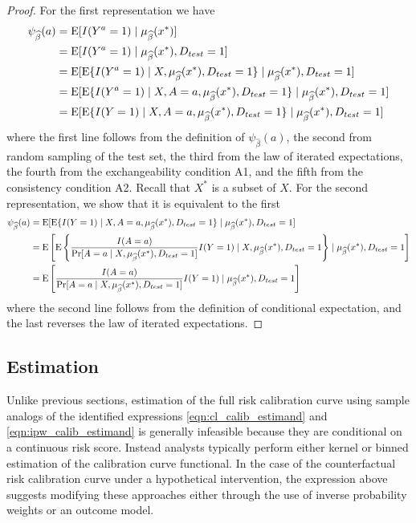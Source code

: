 \begin{proof}
    For the first representation we have 
    \begin{align*}
        \psi_{\widehat{\beta}}(a) &= \operatorname{E}[I(Y^a = 1) \mid \mu_{\widehat{\beta}}(x^*)] \\
        & = \operatorname{E}[I(Y^a = 1) \mid \mu_{\widehat{\beta}}(x^*), D_{test} = 1] \\
        & = \operatorname{E}[\operatorname{E}\{I(Y^a = 1) \mid X, \mu_{\widehat{\beta}}(x^*), D_{test} = 1\}\mid \mu_{\widehat{\beta}}(x^*), D_{test} = 1] \\
        & = \operatorname{E}[\operatorname{E}\{I(Y^a = 1) \mid X, A = a, \mu_{\widehat{\beta}}(x^*), D_{test} = 1\}\mid \mu_{\widehat{\beta}}(x^*), D_{test} = 1] \\
        & = \operatorname{E}[\operatorname{E}\{I(Y = 1) \mid X, A = a, \mu_{\widehat{\beta}}(x^*), D_{test} = 1\}\mid \mu_{\widehat{\beta}}(x^*), D_{test} = 1]
    \end{align*}
    where the first line follows from the definition of $\psi_{\widehat{\beta}}(a)$, the second from random sampling of the test set, the third from the law of iterated expectations, the fourth from the exchangeability condition A1, and the fifth from the consistency condition A2. Recall that $X^*$ is a subset of $X$. For the second representation, we show that it is equivalent to the first 
    \begin{align*}
        \psi_{\widehat{\beta}}(a) &= \operatorname{E}[\operatorname{E}\{I(Y = 1) \mid X, A = a, \mu_{\widehat{\beta}}(x^*), D_{test} = 1\}\mid \mu_{\widehat{\beta}}(x^*), D_{test} = 1] \\
        &= \operatorname{E}\left[\operatorname{E}\left\{\frac{I(A = a)}{\Pr[A = a \mid X, \mu_{\widehat{\beta}}(x^*), D_{test} = 1]} I(Y=1) \mid X, \mu_{\widehat{\beta}}(x^*), D_{test} = 1\right\}\mid \mu_{\widehat{\beta}}(x^*), D_{test} = 1\right] \\
        &= \operatorname{E}\left[\frac{I(A = a)}{\Pr[A = a \mid X, \mu_{\widehat{\beta}}(x^*), D_{test} = 1]} I(Y=1) \mid \mu_{\widehat{\beta}}(x^*), D_{test} = 1\right]
    \end{align*}
    where the second line follows from the definition of conditional expectation, and the last reverses the law of iterated expectations.
\end{proof}

\subsection{Estimation}
Unlike previous sections, estimation of the full risk calibration curve using sample analogs of the identified expressions \ref{eqn:cl_calib_estimand} and \ref{eqn:ipw_calib_estimand} is generally infeasible because they are conditional on a continuous risk score. Instead analysts typically perform either kernel or binned estimation of the calibration curve functional. In the case of the counterfactual risk calibration curve under a hypothetical intervention, the expression above suggests modifying these approaches either through the use of inverse probability weights or an outcome model. 


